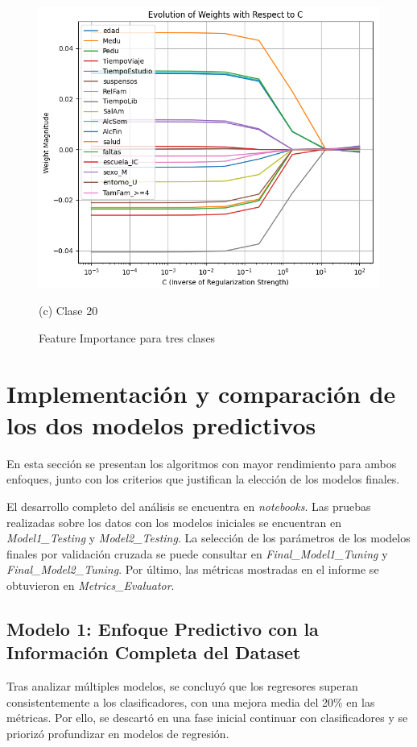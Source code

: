 \documentclass{article}
\begin{document}
\begin{figure}[H]
\begin{minipage}[b]{0.3\textwidth}
      \centering
      \includegraphics[scale=0.25]{FI_Class20.png}
      \caption*{(c) Clase 20}
  \end{minipage}
  \caption{Feature Importance para tres clases}
\end{figure}


\section{Implementación y comparación de los dos modelos predictivos}

En esta sección se presentan los algoritmos con mayor rendimiento para ambos enfoques, junto con los criterios que justifican la elección de los modelos finales.

El desarrollo completo del análisis se encuentra en \textit{notebooks}. Las pruebas realizadas sobre los datos con los modelos iniciales se encuentran en \textit{Model1\_Testing} y \textit{Model2\_Testing}.
La selección de los parámetros de los modelos finales por validación cruzada se puede consultar en \textit{Final\_Model1\_Tuning} y \textit{Final\_Model2\_Tuning}. Por último, las métricas mostradas en el informe
se obtuvieron en \textit{Metrics\_Evaluator}.

\subsection{Modelo 1: Enfoque Predictivo con la Información Completa del Dataset}

Tras analizar múltiples modelos, se concluyó que los regresores superan consistentemente a los clasificadores, con una mejora media del 20\% en las métricas. Por ello, se descartó en una fase inicial continuar con clasificadores y se priorizó profundizar en modelos de regresión.
\end{document}
